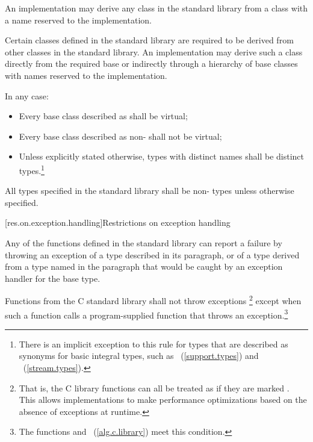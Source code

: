 \pnum
{}%
%
An implementation may derive any class in the \Cpp standard library from a class with a
name reserved to the implementation.

\pnum
Certain classes defined in the \Cpp standard library are required to be derived from
other classes
in the \Cpp standard library.
%
An implementation may derive such a class directly from the required base or indirectly
through a hierarchy of base classes with names reserved to the implementation.

\pnum
In any case:

\begin{itemize}
\item
Every base class described as
shall be virtual;
%
\item
Every base class described as
non-
shall not be virtual;
%
\item
Unless explicitly stated otherwise, types with distinct names shall be distinct
types.\footnote{There is an implicit exception to this rule for types that are
described as synonyms for basic integral types, such as
~(\ref{support.types}) and
~(\ref{stream.types}).}
\end{itemize}

\pnum
All types specified in the \Cpp standard library shall be non- types
unless otherwise specified.

[res.on.exception.handling]{Restrictions on exception handling}%
%

\pnum
Any of the functions defined in the \Cpp standard library
%
can report a failure by throwing an exception of a type described in its
\throws
paragraph,
or of a type derived from a type named in the
\throws
paragraph
that would be caught by
an exception handler
for the base type.

\pnum
Functions from the C standard library shall not throw exceptions%
\footnote{That is, the C
library functions can all be treated as if they
are marked .
This allows implementations to make performance optimizations
based on the absence of exceptions at runtime.}
except when such a function calls a program-supplied function that throws an
exception.\footnote{The functions
and
~(\ref{alg.c.library}) meet this condition.}

